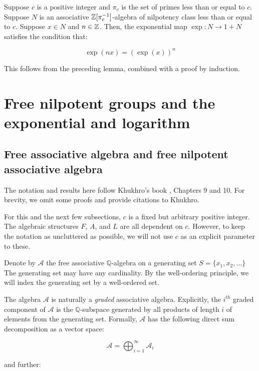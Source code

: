 \begin{lemma}\label{lemma:exp-and-powering}
  Suppose $c$ is a positive integer and $\pi_c$ is the set of primes
  less than or equal to $c$. Suppose $N$ is an associative
  $\mathbb{Z}[\pi_c^{-1}]$-algebra of nilpotency class less than or equal to
  $c$. Suppose $x \in N$ and $n \in \mathbb{Z}$. Then, the exponential map
  $\exp: N \to 1 + N$ satisfies the condition that:

  $$\exp(nx) = (\exp(x))^n$$
\end{lemma}

This follows from the preceding lemma, combined with a proof by
induction.


\section{Free nilpotent groups and the exponential and logarithm}\label{sec:free-nilpotent-exp-log}

\subsection{Free associative algebra and free nilpotent associative algebra}\label{sec:free-associative-algebra}

The notation and results here follow Khukhro's book \cite{Khukhro},
Chapters 9 and 10. For brevity, we omit some proofs and provide
citations to Khukhro.

For this and the next few subsections, $c$ is a fixed but arbitrary
positive integer. The algebraic structures $F$, $A$, and $L$ are all
dependent on $c$. However, to keep the notation as uncluttered as
possible, we will not use $c$ as an explicit parameter to these.

Denote by $\mathcal{A}$ the free associative $\mathbb{Q}$-algebra on a
generating set $S = \{ x_1,x_2,\dots \}$ The generating set may have
any cardinality. By the well-ordering principle, we will index the
generating set by a well-ordered set. 

The algebra $\mathcal{A}$ is naturally a {\em graded} associative
algebra. Explicitly, the $i^{th}$ graded component of $\mathcal{A}$ is
the $\mathbb{Q}$-subspace generated by all products of length $i$ of
elements from the generating set. Formally, $\mathcal{A}$ has the
following direct sum decomposition as a vector space:

$$\mathcal{A} = \bigoplus_{i=1}^\infty \mathcal{A}_i$$

and further:


